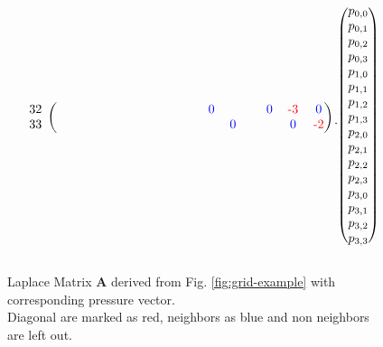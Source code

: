 \begin{figure*}
\[\begin{blockarray}{ccccccccccccccccc}
\begin{block}{c(cccccccccccccccc)}
		32 & & & & & & & & & & & \textcolor{blue}{0} & & & \textcolor{blue}{0} & \textcolor{red}{\text{-}3} & \textcolor{blue}{0}  \\
		33 & & & & & & & & & & & & \textcolor{blue}{0} & & & \textcolor{blue}{0} & \textcolor{red}{\text{-}2} \\
	\end{block}
	\end{blockarray}
	\cdot 
	\begin{blockarray}{c}
	\\
	\begin{block}{(c)}
		p_{0,0} \\
		p_{0,1} \\
		p_{0,2} \\
		p_{0,3} \\
		p_{1,0} \\
		p_{1,1} \\
		p_{1,2} \\
		p_{1,3} \\
		p_{2,0} \\
		p_{2,1} \\
		p_{2,2} \\
		p_{2,3} \\
		p_{3,0} \\
		p_{3,1} \\
		p_{3,2} \\
		p_{3,3} \\
	\end{block}
	\end{blockarray}
\]
\caption{Laplace Matrix \textbf{A} derived from Fig. \ref{fig:grid-example} with corresponding pressure vector.\\
Diagonal are marked as red, neighbors as blue and non neighbors are left out.}\label{fig:laplace-matrix}
\end{figure*}



